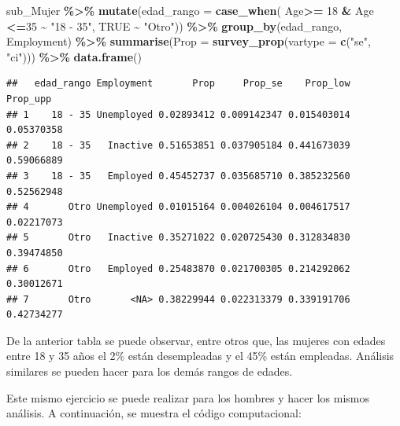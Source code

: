 \documentclass[
  spanish,
  12pt,
]{book}
\newenvironment{Shaded}{\begin{snugshade}}{\end{snugshade}}
\newcommand{\AttributeTok}[1]{\textcolor[rgb]{0.13,0.29,0.53}{#1}}
\newcommand{\ConstantTok}[1]{\textcolor[rgb]{0.56,0.35,0.01}{#1}}
\newcommand{\DecValTok}[1]{\textcolor[rgb]{0.00,0.00,0.81}{#1}}
\newcommand{\FunctionTok}[1]{\textcolor[rgb]{0.13,0.29,0.53}{\textbf{#1}}}
\newcommand{\NormalTok}[1]{#1}
\newcommand{\SpecialCharTok}[1]{\textcolor[rgb]{0.81,0.36,0.00}{\textbf{#1}}}
\newcommand{\StringTok}[1]{\textcolor[rgb]{0.31,0.60,0.02}{#1}}
\begin{document}
\begin{Shaded}
\begin{Highlighting}[]
\NormalTok{sub\_Mujer }\SpecialCharTok{\%\textgreater{}\%} \FunctionTok{mutate}\NormalTok{(}\AttributeTok{edad\_rango =} \FunctionTok{case\_when}\NormalTok{(}
\NormalTok{                     Age}\SpecialCharTok{\textgreater{}=} \DecValTok{18} \SpecialCharTok{\&}\NormalTok{ Age }\SpecialCharTok{\textless{}=}\DecValTok{35}  \SpecialCharTok{\textasciitilde{}} \StringTok{"18 {-} 35"}\NormalTok{, }\ConstantTok{TRUE} \SpecialCharTok{\textasciitilde{}} \StringTok{"Otro"}\NormalTok{)) }\SpecialCharTok{\%\textgreater{}\%}
                     \FunctionTok{group\_by}\NormalTok{(edad\_rango, Employment) }\SpecialCharTok{\%\textgreater{}\%} 
                     \FunctionTok{summarise}\NormalTok{(}\AttributeTok{Prop =} \FunctionTok{survey\_prop}\NormalTok{(}\AttributeTok{vartype =}  \FunctionTok{c}\NormalTok{(}\StringTok{"se"}\NormalTok{, }\StringTok{"ci"}\NormalTok{))) }\SpecialCharTok{\%\textgreater{}\%} 
                     \FunctionTok{data.frame}\NormalTok{()}
\end{Highlighting}
\end{Shaded}

\begin{verbatim}
##   edad_rango Employment       Prop     Prop_se    Prop_low   Prop_upp
## 1    18 - 35 Unemployed 0.02893412 0.009142347 0.015403014 0.05370358
## 2    18 - 35   Inactive 0.51653851 0.037905184 0.441673039 0.59066889
## 3    18 - 35   Employed 0.45452737 0.035685710 0.385232560 0.52562948
## 4       Otro Unemployed 0.01015164 0.004026104 0.004617517 0.02217073
## 5       Otro   Inactive 0.35271022 0.020725430 0.312834830 0.39474850
## 6       Otro   Employed 0.25483870 0.021700305 0.214292062 0.30012671
## 7       Otro       <NA> 0.38229944 0.022313379 0.339191706 0.42734277
\end{verbatim}

De la anterior tabla se puede observar, entre otros que, las mujeres con edades entre 18 y 35 años el 2\% están desempleadas y el 45\% están empleadas. Análisis similares se pueden hacer para los demás rangos de edades.

Este mismo ejercicio se puede realizar para los hombres y hacer los mismos análisis. A continuación, se muestra el código computacional:
\end{document}
